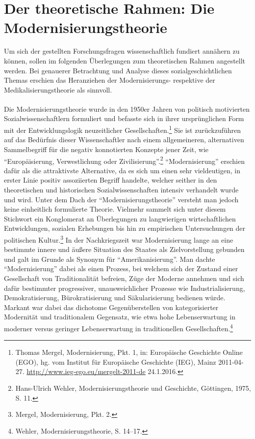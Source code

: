 \documentclass[
    a4paper,
    12pt,
    hyphens,
    chapterprefix=true,
    headheight=33pt,
    footheight=29pt,
    headings=optiontohead, %
]{scrartcl}
\begin{document}
\section{Der theoretische Rahmen: Die Modernisierungstheorie}
Um sich der gestellten Forschungsfragen wissenschaftlich fundiert annähern zu können, sollen im folgenden Überlegungen zum theoretischen Rahmen angestellt werden. Bei genauerer Betrachtung und Analyse dieses sozialgeschichtlichen Themas erschien das Heranziehen der Modernisierungs- respektive der Medikalisierungstheorie als sinnvoll.\\
\\
Die Modernisierungstheorie wurde in den 1950er Jahren von politisch motivierten Sozialwissenschaftlern formuliert und befasste sich in ihrer ursprünglichen Form mit der Entwicklungslogik neuzeitlicher Gesellschaften.\footnote{Thomas Mergel, Modernisierung, Pkt. 1, in: Europäische Geschichte Online (EGO), hg. vom Institut für Europäische Geschichte (IEG), Mainz 2011-04-27. \url{http://www.ieg-ego.eu/mergelt-2011-de} 24.1.2016.} Sie ist zurückzuführen auf das Bedürfnis dieser Wissenschaftler nach einem allgemeineren, alternativen Sammelbegriff für die negativ konnotierten Konzepte jener Zeit, wie "`Europäisierung, Verwestlichung oder Zivilisierung"'.\footnote{Hans-Ulrich Wehler, Modernisierungstheorie und Geschichte, Göttingen, 1975, S. 11.} "`Modernisierung"' erschien dafür als die attraktivste Alternative, da es sich um einen sehr vieldeutigen, in erster Linie positiv assoziierten Begriff handelte, welcher seither in den theoretischen und historischen Sozialwissenschaften intensiv verhandelt wurde und wird. Unter dem Dach der "`Modernisierungstheorie"' versteht man jedoch keine einheitlich formulierte Theorie. Vielmehr sammelt sich unter diesem Stichwort ein Konglomerat an Überlegungen zu langwierigen wirtschaftlichen Entwicklungen, sozialen Erhebungen bis hin zu empirischen Untersuchungen der politischen Kultur.\footnote{Mergel, Modernisierung, Pkt. 2.} In der Nachkriegszeit war Modernisierung lange an eine bestimmte innere und äußere Situation des Staates als Zielvorstellung gebunden und galt im Grunde als Synonym für "`Amerikanisierung"'. Man dachte "`Modernisierung"' dabei als einen Prozess, bei welchem sich der Zustand einer Gesellschaft von Traditionalität befreien, Züge der Moderne annehmen und sich dafür bestimmter progressiver, unausweichlicher Prozesse wie Industrialisierung, Demokratisierung, Bürokratisierung und Säkularisierung bedienen würde. Markant war dabei das dichotome Gegenüberstellen von kategorisierter Modernität und traditionalem Gegensatz, wie etwa hohe Lebenserwartung in moderner versus geringer Lebenserwartung in traditionellen Gesellschaften.\footnote{Wehler, Modernisierungstheorie, S. 14--17.}\\
\end{document}
